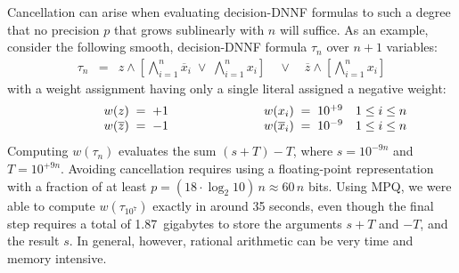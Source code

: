 \documentclass[letterpaper,USenglish,cleveref, autoref, thm-restate]{lipics-v2021}
\newcommand{\obar}[1]{\overline{#1}}
\begin{document}
Cancellation can arise when evaluating decision-DNNF formulas to such a degree that no precision $p$ that grows sublinearly with $n$ will suffice.
As an example, consider the following smooth, decision-DNNF formula $\tau_n$ over $n+1$ variables:
\begin{eqnarray}
\tau_n  & = & z \land \left[\bigwedge_{i = 1}^{n} \obar{x}_i \; \lor \; \bigwedge_{i = 1}^{n} x_i\right] \quad \lor \quad \obar{z} \land \left [\bigwedge_{i = 1}^{n} x_i\right] \label{eqn:max:precision}
\end{eqnarray}
with a weight assignment having only a single literal assigned a negative weight:
\begin{displaymath}
\begin{array}{lllll}
\makebox[1cm]{} &  w(z) \; = \; +1 & \makebox[2cm]{} &  w(x_i) \; = \; 10^{+9} & 1 \leq i \leq n \\
\makebox[1cm]{} &  w(\obar{z}) \; = \; -1 & &  w(\obar{x}_i) \; = \; 10^{-9} & 1 \leq i \leq n \\
\end{array}
\end{displaymath}
Computing $w(\tau_n)$  evaluates the sum $(s + T) - T$, where
$s = 10^{-9n}$ and $T = 10^{+9n}$.  Avoiding cancellation requires using a floating-point representation with a fraction of at least
$p = (18 \cdot \log_2 10)\, n \approx 60 \, n$ bits.
Using MPQ, we were able to compute $w(\tau_{10^7})$ exactly in around 35 seconds, even though the final step requires a total of 1.87~gigabytes to store the arguments
$s+T$ and $-T$, and the result $s$.  In general, however, rational arithmetic can be very time and memory intensive.
\end{document}
